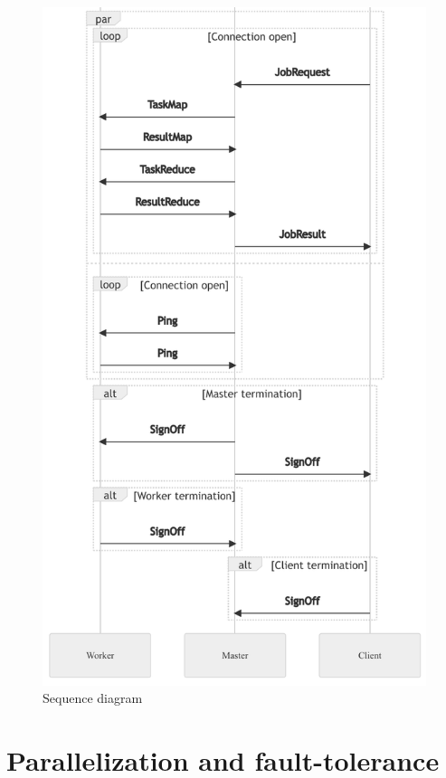 \documentclass[12pt, letterpaper]{article}
\begin{document}
\begin{figure}[hp]
	\centering
	\includegraphics[width=0.75\linewidth]{img/SequenceDiagramPart2}
	\caption{Sequence diagram}
	\label{fig:sequenceDiagramPart2}
\end{figure}

\section{Parallelization and fault-tolerance}
\end{document}
